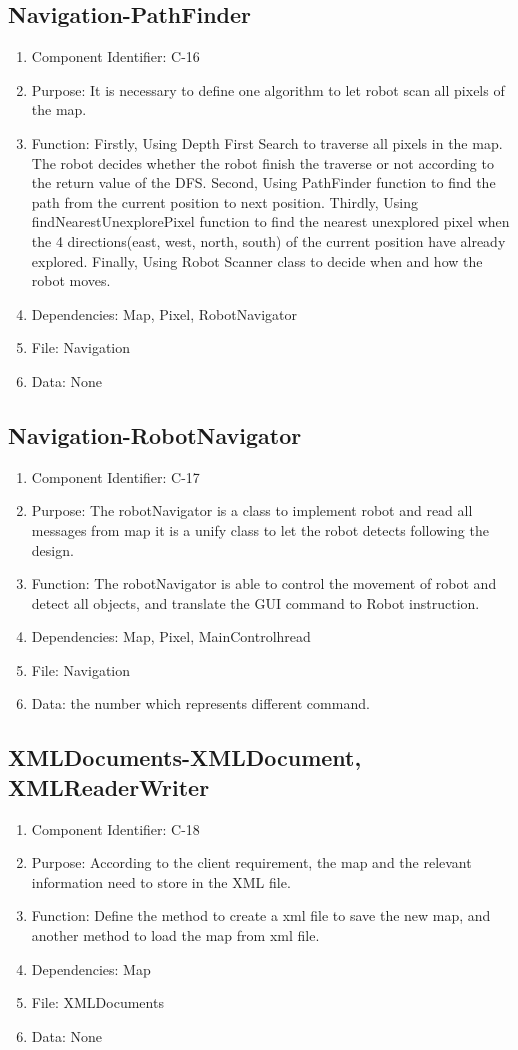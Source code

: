 \documentclass[11pt, a4paper]{report}
\begin{document}
\subsection{Navigation-PathFinder}
\begin{enumerate}
\item Component Identifier: C-16
\item Purpose: It is necessary to define one algorithm to let robot scan all pixels of the map.
\item Function: Firstly, Using Depth First Search to traverse all pixels in the map. The robot decides whether the robot finish the traverse or not according to the return value of the DFS. Second, Using PathFinder function to find the path from the current position to next position. Thirdly, Using findNearestUnexplorePixel function to find the nearest unexplored pixel when the 4
directions(east, west, north, south) of the current position have already explored. Finally, Using Robot Scanner class to decide when and how the robot moves.
\item Dependencies: Map, Pixel, RobotNavigator
\item File: Navigation
\item Data: None
\end{enumerate}

\subsection{Navigation-RobotNavigator}
\begin{enumerate}
\item Component Identifier: C-17
\item Purpose: The robotNavigator is a class to implement robot and read all messages from map it is a unify class to let the robot detects following the design. 
\item Function: The robotNavigator is able to control the movement of robot and detect all objects, and translate the GUI command to Robot instruction.   
\item Dependencies: Map, Pixel, MainControlhread
\item File: Navigation
\item Data: the number which represents different command.
\end{enumerate}

\subsection{XMLDocuments-XMLDocument, XMLReaderWriter}
\begin{enumerate}
\item Component Identifier: C-18
\item Purpose: According to the client requirement, the map and the relevant information need to store in the XML file. 
\item Function: Define the method to create a xml file to save the new map, and another method to load the map from xml file.
\item Dependencies: Map
\item File: XMLDocuments
\item Data: None
\end{enumerate}
\end{document}
